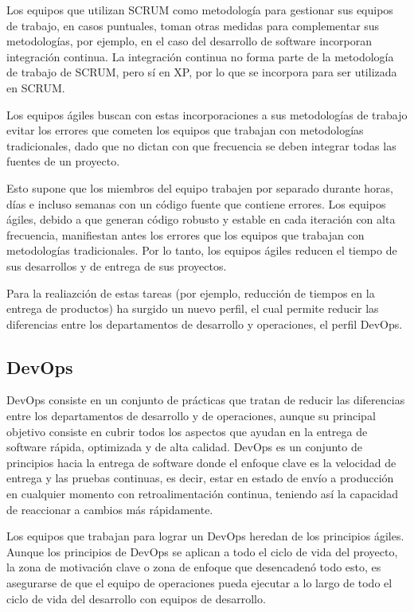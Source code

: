 Los equipos que utilizan SCRUM como metodología para gestionar sus equipos de trabajo, en casos puntuales, toman otras medidas para complementar sus metodologías, por ejemplo, en el caso del desarrollo de software incorporan integración continua. La integración continua no forma parte de la metodología de trabajo de SCRUM, pero sí en \ac{XP}, por lo que se incorpora para ser utilizada en SCRUM.

Los equipos ágiles buscan con estas incorporaciones a sus metodologías de trabajo evitar los errores que cometen los equipos que trabajan con metodologías tradicionales, dado que no dictan con que frecuencia se deben integrar todas las fuentes de un proyecto.

Esto supone que los miembros del equipo trabajen por separado durante horas, días e incluso semanas con un código fuente que contiene errores. Los equipos ágiles, debido a que generan código robusto y estable en cada iteración con alta frecuencia, manifiestan antes los errores que los equipos que trabajan con metodologías tradicionales. Por lo tanto, los equipos ágiles reducen el tiempo de sus desarrollos y de entrega de sus proyectos.

Para la realiazción de estas tareas (por ejemplo, reducción de tiempos en la entrega de productos) ha surgido un nuevo perfil, el cual permite reducir las diferencias entre los departamentos de desarrollo y operaciones, el perfil DevOps.

\subsection{DevOps}
\ac{DevOps} consiste en un conjunto de prácticas que tratan de reducir las diferencias entre los departamentos de desarrollo y de operaciones, aunque su principal objetivo consiste en cubrir todos los aspectos que ayudan en la entrega de software rápida, optimizada y de alta calidad. \ac{DevOps} es un conjunto de principios hacia la entrega de software donde el enfoque clave es la velocidad de entrega y las pruebas continuas, es decir, estar en estado de envío a producción en cualquier momento con retroalimentación continua, teniendo así la capacidad de reaccionar a cambios más rápidamente.

Los equipos que trabajan para lograr un \ac{DevOps} heredan de los principios ágiles. Aunque los principios de \ac{DevOps} se aplican a todo el ciclo de vida del proyecto, la zona de motivación clave o zona de enfoque que desencadenó todo esto, es asegurarse de que el equipo de operaciones pueda ejecutar a lo largo de todo el ciclo de vida del desarrollo con equipos de desarrollo.

